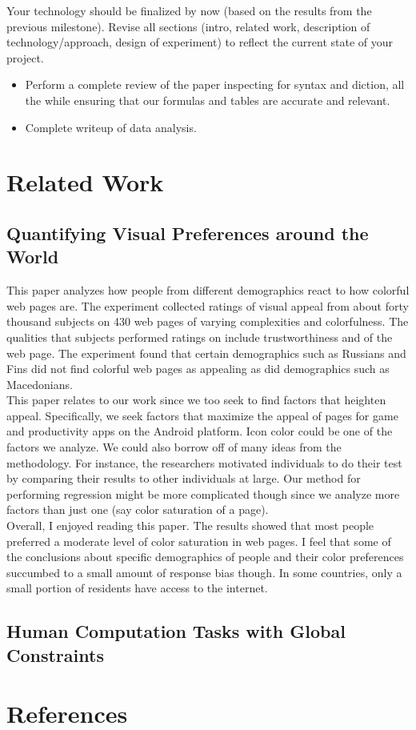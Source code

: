 \documentclass{article}
\begin{document}
Your technology should be finalized by now (based on the results from the previous milestone). Revise all sections (intro, related work, description of technology/approach, design of experiment) to reflect the current state of your project. \\

\begin{itemize}
\item Perform a complete review of the paper inspecting for syntax and diction, all the while ensuring that our formulas and tables are accurate and relevant.
\item Complete writeup of data analysis.
\end{itemize}

\section{Related Work}

\subsection{Quantifying Visual Preferences around the World}
This paper analyzes how people from different demographics react to how colorful web pages are. The experiment collected ratings of visual appeal from about forty thousand subjects on 430 web pages of varying complexities and colorfulness. The qualities that subjects performed ratings on include trustworthiness and  of the web page. The experiment found that certain demographics such as Russians and Fins did not find colorful web pages as appealing as did demographics such as Macedonians. \\

This paper relates to our work since we too seek to find factors that heighten appeal. Specifically, we seek factors that maximize the appeal of pages for game and productivity apps on the Android platform. Icon color could be one of the factors we analyze. We could also borrow off of many ideas from the methodology. For instance, the researchers motivated individuals to do their test by comparing their results to other individuals at large. Our method for performing regression might be more complicated though since we analyze more factors than just one (say color saturation of a page). \\

Overall, I enjoyed reading this paper. The results showed that most people preferred a moderate level of color saturation in web pages. I feel that some of the conclusions about specific demographics of people and their color preferences succumbed to a small amount of response bias though. In some countries, only a small portion of residents have access to the internet.

\subsection{Human Computation Tasks with Global Constraints}



\section{References}

{}

\end{document}
